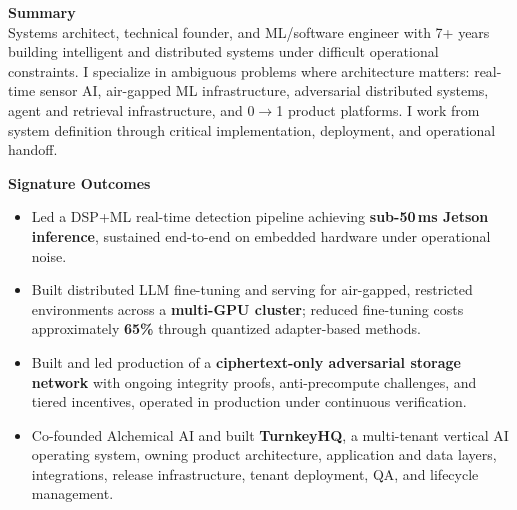 \documentclass[10.5pt]{res}
\begin{document}
\begin{resume}
{\bf Summary} \vspace{.15 cm}\\
Systems architect, technical founder, and ML/software engineer with 7+ years building intelligent and distributed systems under difficult operational constraints. I specialize in ambiguous problems where architecture matters: real-time sensor AI, air-gapped ML infrastructure, adversarial distributed systems, agent and retrieval infrastructure, and 0$\rightarrow$1 product platforms. I work from system definition through critical implementation, deployment, and operational handoff.
\vspace{.16 cm}

{\bf Signature Outcomes} \\
\begin{itemize}[itemsep=1pt,topsep=2pt]
    \item Led a DSP+ML real-time detection pipeline achieving \textbf{sub-50\,ms Jetson inference}, sustained end-to-end on embedded hardware under operational noise.
    \item Built distributed LLM fine-tuning and serving for air-gapped, restricted environments across a \textbf{multi-GPU cluster}; reduced fine-tuning costs approximately \textbf{65\%} through quantized adapter-based methods.
    \item Built and led production of a \textbf{ciphertext-only adversarial storage network} with ongoing integrity proofs, anti-precompute challenges, and tiered incentives, operated in production under continuous verification.
    \item Co-founded Alchemical AI and built \textbf{TurnkeyHQ}, a multi-tenant vertical AI operating system, owning product architecture, application and data layers, integrations, release infrastructure, tenant deployment, QA, and lifecycle management.
\end{itemize}


\end{resume}
\end{document}
